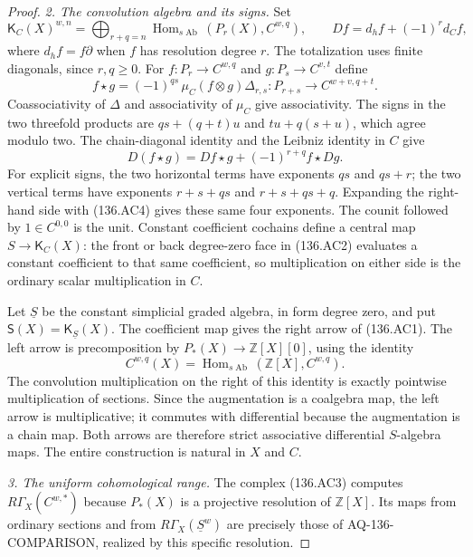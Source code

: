 \begin{proof}
\emph{2. The convolution algebra and its signs.}
Set
\[
 \mathsf K_C(X)^{w,n}
   =\bigoplus_{r+q=n}
       \operatorname{Hom}_{s\operatorname{Ab}}
                              (P_r(X),C^{w,q}),
 \qquad
 Df=d_hf+(-1)^r d_Cf,                                   \tag{136.AC3}
\]
where $d_hf=f\partial$ when $f$ has resolution degree $r$.
The totalization uses finite diagonals, since $r,q\geq0$.
For $f:P_r\to C^{w,q}$ and $g:P_s\to C^{v,t}$ define
\[
 f\star g=(-1)^{qs}\,
       \mu_C(f\otimes g)\Delta_{r,s}
       :P_{r+s}\longrightarrow C^{w+v,q+t}.             \tag{136.AC4}
\]
Coassociativity of $\Delta$ and associativity of $\mu_C$
give associativity. The signs in the two threefold products
are $qs+(q+t)u$ and $tu+q(s+u)$, which agree modulo two.
The chain-diagonal identity and the Leibniz identity in $C$
give
\[
 D(f\star g)=Df\star g+(-1)^{r+q}f\star Dg.
\]
For explicit signs, the two horizontal terms have exponents
$qs$ and $qs+r$; the two vertical terms have exponents
$r+s+qs$ and $r+s+qs+q$. Expanding the right-hand side
with (136.AC4) gives these same four exponents. The
counit followed by $1\in C^{0,0}$ is the unit.
Constant coefficient cochains define a central map
$S\to\mathsf K_C(X)$: the front or back degree-zero
face in (136.AC2) evaluates a constant coefficient to
that same coefficient, so multiplication on either side
is the ordinary scalar multiplication in $C$.

Let $\underline S$ be the constant simplicial graded
algebra, in form degree zero, and put
$\mathsf S(X)=\mathsf K_{\underline S}(X)$.
The coefficient map gives the right arrow of (136.AC1).
The left arrow is precomposition by
$P_*(X)\to\mathbb Z[X][0]$, using the identity
\[
 C^{w,q}(X)=\operatorname{Hom}_{s\operatorname{Ab}}
                          (\mathbb Z[X],C^{w,q}).
\]
The convolution multiplication on the right of this
identity is exactly pointwise multiplication of sections.
Since the augmentation is a coalgebra map, the left
arrow is multiplicative; it commutes with differential
because the augmentation is a chain map. Both arrows
are therefore strict associative differential $S$-algebra
maps. The entire construction is natural in $X$ and $C$.

\emph{3. The uniform cohomological range.}
The complex (136.AC3) computes
$R\Gamma_X(C^{w,*})$ because $P_*(X)$ is a projective
resolution of $\mathbb Z[X]$. Its maps from ordinary
sections and from $R\Gamma_X(\underline S^w)$ are
precisely those of AQ-136-COMPARISON, realized by this
specific resolution.


\end{proof}
